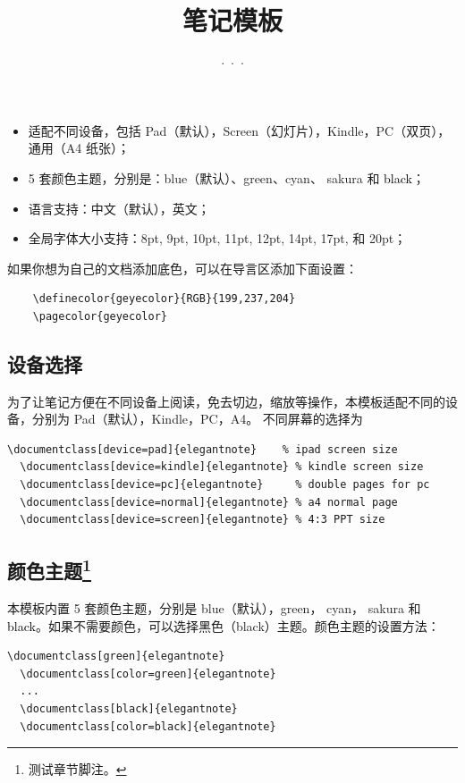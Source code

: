 \documentclass[cn,hazy,blue,14pt,normal]{elegantnote}
\title{笔记模板}
\author{···}
\institute{···}
\date{\zhtoday}
\begin{document}
\maketitle

\newpage

\begin{itemize}
  \item 适配不同设备，包括 Pad（默认），Screen（幻灯片），Kindle，PC（双页），通用（A4 纸张）；
  \item 5 套颜色主题，分别是：\textcolor{eblue}{blue}（默认）、\textcolor{egreen}{green}、\textcolor{ecyan}{cyan}、 \textcolor{sakura}{sakura} 和 \textcolor{black}{black}；
  \item 语言支持：中文（默认），英文；
  \item 全局字体大小支持：8pt, 9pt, 10pt, 11pt, 12pt, 14pt, 17pt, 和 20pt；
\end{itemize}

\begin{remark}
  如果你想为自己的文档添加底色，可以在导言区添加下面设置：
  \begin{lstlisting}
    \definecolor{geyecolor}{RGB}{199,237,204}
    \pagecolor{geyecolor}
  \end{lstlisting}
\end{remark}

\subsection{设备选择}

为了让笔记方便在不同设备上阅读，免去切边，缩放等操作，本模板适配不同的设备，分别为 Pad（默认），Kindle，PC，A4。
不同屏幕的选择为
\begin{lstlisting}[frame=none]  
  \documentclass[device=pad]{elegantnote}    % ipad screen size
  \documentclass[device=kindle]{elegantnote} % kindle screen size
  \documentclass[device=pc]{elegantnote}     % double pages for pc 
  \documentclass[device=normal]{elegantnote} % a4 normal page
  \documentclass[device=screen]{elegantnote} % 4:3 PPT size
\end{lstlisting}

\subsection[颜色主题]{颜色主题\footnote{测试章节脚注。}}

本模板内置 5 套颜色主题，分别是 \textcolor{eblue}{blue}（默认），\textcolor{egreen}{green}， \textcolor{ecyan}{cyan}， \textcolor{sakura}{sakura} 和 \textcolor{black}{black}。如果不需要颜色，可以选择黑色（black）主题。颜色主题的设置方法：
\begin{lstlisting}[frame=none]  
  \documentclass[green]{elegantnote}
  \documentclass[color=green]{elegantnote}
  ...
  \documentclass[black]{elegantnote}
  \documentclass[color=black]{elegantnote}
\end{lstlisting}
\end{document}
